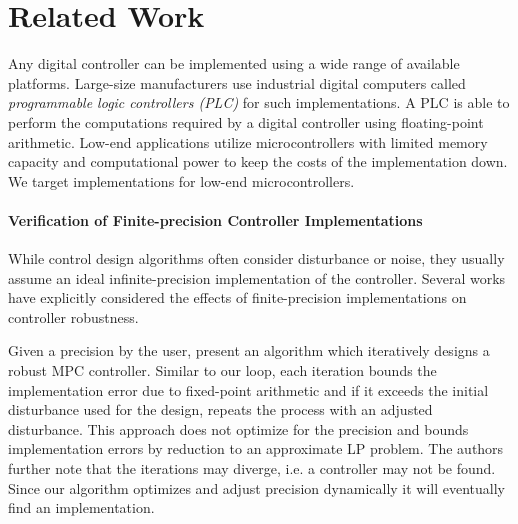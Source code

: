 \section{Related Work}

Any digital controller can be implemented using a wide range of available
platforms. Large-size manufacturers use industrial digital computers called
\emph{programmable logic controllers (PLC)} for such implementations. A PLC is
able to perform the computations required by a digital controller using
floating-point arithmetic.  Low-end applications utilize microcontrollers with
limited memory capacity and computational power to keep the costs of the
implementation down.
We target implementations for low-end microcontrollers.

\paragraph{Verification of Finite-precision Controller Implementations}

While control design algorithms often consider disturbance or noise, they
usually assume an ideal infinite-precision implementation of the controller.
Several works have explicitly considered the effects of finite-precision
implementations on controller robustness.

Given a precision by the user, \citet{imperialrmpc} present an algorithm which
iteratively designs a robust MPC controller. Similar to our loop, each iteration
bounds the implementation error due to fixed-point arithmetic and if it exceeds
the initial disturbance used for the design, repeats the process with an
adjusted disturbance. This approach does not optimize for the precision and
bounds implementation errors by reduction to an approximate LP problem. The
authors further note that the iterations may diverge, i.e. a controller may not
be found. Since our algorithm optimizes and adjust precision dynamically it will
eventually find an implementation.

